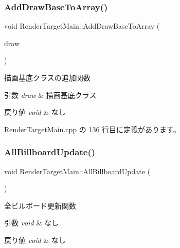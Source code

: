 \subsubsection{\texorpdfstring{Add\+Draw\+Base\+To\+Array()}{AddDrawBaseToArray()}}
{\footnotesize\ttfamily void Render\+Target\+Main\+::\+Add\+Draw\+Base\+To\+Array (\begin{DoxyParamCaption}\item[{\mbox{\hyperlink{class_draw_base}{Draw\+Base}} $\ast$}]{draw }\end{DoxyParamCaption})}



描画基底クラスの追加関数 


\begin{DoxyParams}{引数}
{\em draw} & 描画基底クラス \\
\hline
\end{DoxyParams}

\begin{DoxyRetVals}{戻り値}
{\em void} & なし \\
\hline
\end{DoxyRetVals}


 Render\+Target\+Main.\+cpp の 136 行目に定義があります。

\mbox{\label{class_render_target_main_af59ffe67a2ccc4dc1c280362e2473d9b}} 
\subsubsection{\texorpdfstring{All\+Billboard\+Update()}{AllBillboardUpdate()}}
{\footnotesize\ttfamily void Render\+Target\+Main\+::\+All\+Billboard\+Update (\begin{DoxyParamCaption}{ }\end{DoxyParamCaption})\hspace{0.3cm}{\ttfamily [private]}}



全ビルボード更新関数 


\begin{DoxyParams}{引数}
{\em void} & なし \\
\hline
\end{DoxyParams}

\begin{DoxyRetVals}{戻り値}
{\em void} & なし \\
\hline
\end{DoxyRetVals}


